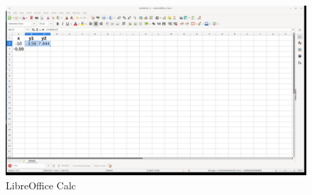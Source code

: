 \begin{figure}[h!]		
	\centering
   	\includegraphics[width=8.0in]{pictures/picture_009.png}
  	\caption{LibreOffice Calc}
   	\label{fig:LibreOfficeCalc009}
\end{figure}